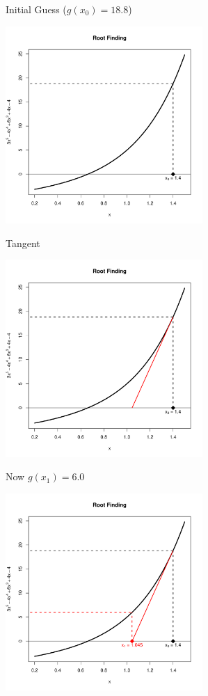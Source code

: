 \documentclass[10pt]{beamer}
\begin{document}
\begin{frame}{Initial Guess ($g(x_0)=18.8$)}
  \begin{center}
    \includegraphics[height=7.5cm]{RCode/rf2.pdf}
  \end{center}
\end{frame}
\begin{frame}{Tangent}
  \begin{center}
    \includegraphics[height=7.5cm]{RCode/rf3.pdf}
  \end{center}
\end{frame}
\begin{frame}{Now $g(x_1)=6.0$}
  \begin{center}
    \includegraphics[height=7.5cm]{RCode/rf4.pdf}
  \end{center}
\end{frame}
\end{document}
